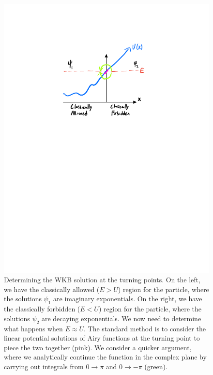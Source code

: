 \begin{figure}[htbp]
    \centering
    \includegraphics[scale=0.8]{Images/connectionformula.pdf}

    \caption{Determining the WKB solution at the turning points. On the left, we have the classically allowed ($E > U$) region for the particle, where the solutions $\psi_1$ are imaginary exponentials. On the right, we have the classically forbidden ($E < U$) region for the particle, where the solutions $\psi_2$ are decaying exponentials. We now need to determine what happens when $E \approx U$. The standard method is to consider the linear potential solutions of Airy functions at the turning point to piece the two together (pink). We consider a quicker argument, where we analytically continue the function in the complex plane by carrying out integrals from $0 \to \pi$ and $0 \to -\pi$ (green).}
    \label{fig-connectionformula}
\end{figure}


